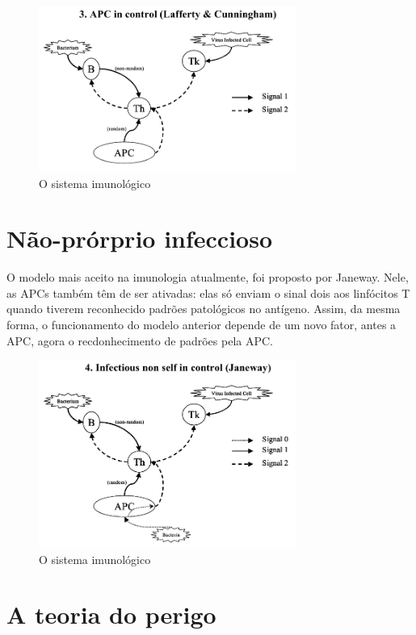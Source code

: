 \documentclass{iiufrgs}
\begin{document}
\begin{figure}[h]
\centering
\includegraphics[width=0.75\textwidth]{img/signals3-apc.png}
\caption{O sistema imunológico}
\end{figure}

\section{Não-prórprio infeccioso}

O modelo mais aceito na imunologia atualmente, foi proposto por Janeway. Nele, as APCs também têm de ser ativadas: elas só enviam o sinal dois aos linfócitos T quando tiverem reconhecido padrões patológicos no antígeno. Assim, da mesma forma, o funcionamento do modelo anterior depende de um novo fator, antes a APC, agora o recdonhecimento de padrões pela APC.

\begin{figure}[h]
\centering
\includegraphics[width=0.75\textwidth]{img/signals4-ins.png}
\caption{O sistema imunológico}
\end{figure}

\section{A teoria do perigo}
\end{document}
